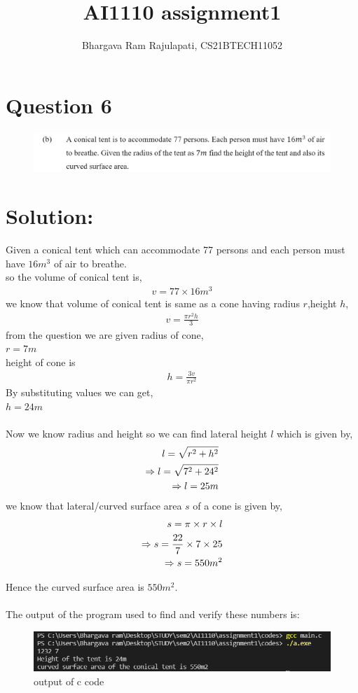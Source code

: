 \documentclass[12pt]{article}
\title{AI1110 assignment1}
\author{Bhargava Ram Rajulapati, CS21BTECH11052}
\begin{document}
  \maketitle
  \section*{Question 6}
  \begin{figure}[h]
  \includegraphics[width=\textwidth]{question.png}
  \end{figure}
  \section*{Solution:}
  Given a conical tent which can accommodate 77 persons and each         
   person must have $16m^3$ of air to breathe.\\
  so the volume of conical tent is,
  \begin{align*}
    v = 77 \times 16 m^3 
  \end{align*}
  we know that volume of conical tent is same as a cone having
  radius $r$,height $h$,
  \begin{align*}
     v = \frac{\pi r^2 h}{3} 
  \end{align*}
  from the question we are given radius of cone, \\
  $ r = 7 m $\\ 
  height of cone is
  \begin{align*}
   h = \frac{3 v}{\pi r^2} 
  \end{align*}
  By substituting values we can get, \\
  $ h = 24 m $ \\\\
  Now we know radius and height so we can find lateral height $l$
  which is given by,
  \begin{align*}
    \hspace*{12pt} l = \sqrt{r^2 + h^2} \\
    \Rightarrow l = \sqrt{7^2 + 24^2} \\
    \Rightarrow l = 25 m
  \end{align*}
  we know that lateral/curved surface area $s$ of a cone is given
  by,
  \begin{align*}
    \hspace*{12pt} s = \pi \times r \times l \\
    \Rightarrow  s = \frac{22}{7} \times 7 \times 25  \\
    \Rightarrow  s = 550 m^2 
  \end{align*}
   
  Hence the curved surface area is $ 550 m^2 $. \\\\
  The output of the program used to find and verify these numbers
  is: \\
  \begin{figure}[h]
  \includegraphics[width=\textwidth]{output.png}
  \caption{output of c code}
  \end{figure}   
\end{document}
